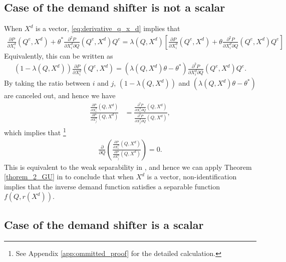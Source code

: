 \documentclass[11pt, a4paper]{article}
\theoremstyle{remark}
\begin{document}
\subsection{Case of the demand shifter is not a scalar}\label{sec:case_x_d_not_scalar}
When $X^{d}$ is a vector, \eqref{eq:derivative_q_x_d} implies that
\begin{align}
    \frac{\partial P}{\partial X^{d}_{i}}(Q^e, X^{d}) + \theta^{*}\frac{\partial^2 P}{\partial X^{d}_{i}\partial Q}(Q^e, X^{d})Q^e  = \lambda(Q, X^{d}) \left[\frac{\partial P}{\partial X^{d}_{i}}(Q^e, X^{d}) + \theta\frac{\partial^2 P}{\partial X^{d}_{i}\partial Q}(Q^e, X^{d})Q^e \right]
\end{align}
Equivalently, this can be written as
\begin{align}
    (1 -  \lambda(Q, X^{d}))\frac{\partial P}{\partial X^{d}_{i}}(Q^e, X^{d}) = (\lambda(Q, X^{d})\theta  - \theta^*)\frac{\partial^2 P}{\partial X^{d}_{i}\partial Q}(Q^e, X^{d})Q^e.
\end{align}
By taking the ratio between $i$ and $j$, $(1 - \lambda(Q, X^{d}))$ and  $(\lambda(Q, X^{d})\theta - \theta^{*})$ are canceled out, and hence we have
\begin{align}
    \frac{\frac{\partial P}{\partial X^{d}_{i}}(Q, X^{d})}{\frac{\partial P}{\partial X^{d}_{j}}(Q, X^{d})} & = \frac{ \frac{\partial^2 P}{\partial X^{d}_{i} \partial Q}(Q, X^{d})}{\frac{\partial^2 P}{\partial X^{d}_{j} \partial Q}(Q, X^{d})}, \label{eq:ratio_inverse_demand}
\end{align}
which implies that \footnote{See Appendix \ref{app:ommitted_proof} for the detailed calculation.}
\begin{align}
    \frac{\partial}{\partial Q} \left(\frac{\frac{\partial P}{\partial X^{d}_{i}}(Q, X^{d})}{\frac{\partial P}{\partial X^{d}_{j}}(Q, X^{d})}\right) = 0.
\end{align}
This is equivalent to the weak separability in \citet{goldmanNote1964}, and hence we can apply Theorem \ref{thorem_2_GU} in \citet{goldmanNote1964} to conclude that when $X^{d}$ is a vector, non-identification implies that the inverse demand function satisfies a separable function $f(Q, r(X^{d}))$.



\subsection{Case of the demand shifter is a scalar}\label{sec:case_x_d_scalar}
\end{document}
